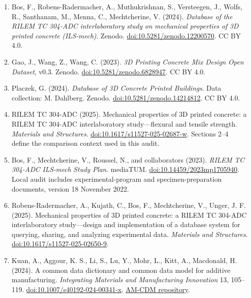 \documentclass[
  american,
  11pt,
  letterpaper,
]{article}
\begin{document}
\begin{enumerate}
{  repository}. MIT license. This paper audits the retained June 2026
  excerpt, not a newly sampled current repository dataset.
\item
  Bos, F., Robens-Radermacher, A., Muthukrishnan, S., Versteegen, J.,
  Wolfs, R., Santhanam, M., Menna, C., Mechtcherine, V. (2024).
  \emph{Database of the RILEM TC 304-ADC interlaboratory study on
  mechanical properties of 3D printed concrete (ILS-mech)}. Zenodo.
  \href{https://doi.org/10.5281/zenodo.12200570}{doi:10.5281/zenodo.12200570}.
  CC BY 4.0.
\item
  Gao, J., Wang, Z., Wang, C. (2023). \emph{3D Printing Concrete Mix
  Design Open Dataset}, v0.3. Zenodo.
  \href{https://doi.org/10.5281/zenodo.6828947}{doi:10.5281/zenodo.6828947}.
  CC BY 4.0.
\item
  Placzek, G. (2024). \emph{Database of 3D Concrete Printed Buildings}.
  Data collection: M. Dahlberg. Zenodo.
  \href{https://doi.org/10.5281/zenodo.14214812}{doi:10.5281/zenodo.14214812}.
  CC BY 4.0.
\item
  RILEM TC 304-ADC (2025). Mechanical properties of 3D printed concrete:
  a RILEM TC 304-ADC interlaboratory study---flexural and tensile
  strength. \emph{Materials and Structures}.
  \href{https://doi.org/10.1617/s11527-025-02687-w}{doi:10.1617/s11527-025-02687-w}.
  Sections 2--4 define the comparison context used in this audit.
\item
  Bos, F., Mechtcherine, V., Roussel, N., and collaborators (2023).
  \emph{RILEM TC 304-ADC ILS-mech Study Plan}. mediaTUM.
  \href{https://doi.org/10.14459/2023mp1705940}{doi:10.14459/2023mp1705940}.
  Local audit includes experimental-program and specimen-preparation
  documents, version 18 November 2022.
\item
  Robens-Radermacher, A., Kujath, C., Bos, F., Mechtcherine, V., Unger,
  J. F. (2025). Mechanical properties of 3D printed concrete: a RILEM TC
  304-ADC interlaboratory study---design and implementation of a
  database system for querying, sharing, and analyzing experimental
  data. \emph{Materials and Structures}.
  \href{https://doi.org/10.1617/s11527-025-02650-9}{doi:10.1617/s11527-025-02650-9}.
\item
  Kuan, A., Aggour, K. S., Li, S., Lu, Y., Mohr, L., Kitt, A.,
  Macdonald, H. (2024). A common data dictionary and common data model
  for additive manufacturing. \emph{Integrating Materials and
  Manufacturing Innovation} 13, 105--119.
  \href{https://doi.org/10.1007/s40192-024-00341-x}{doi:10.1007/s40192-024-00341-x}.
  \href{https://github.com/AM-CDM/AM-CDM}{AM-CDM repository}.

\end{enumerate}
\end{document}
